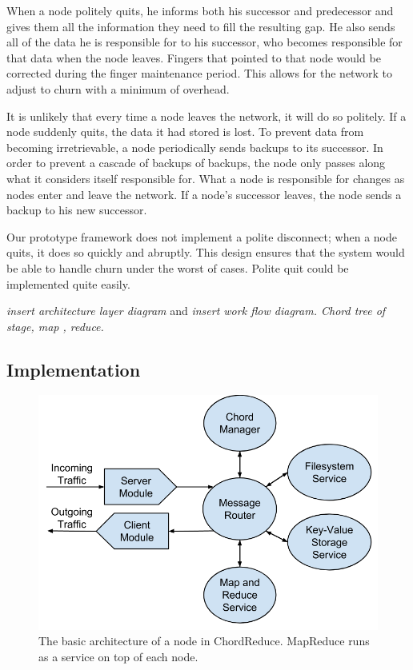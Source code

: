 \documentclass[10pt, conference, compsocconf]{IEEEtran}
\begin{document}
When a node politely quits, he informs both his successor and predecessor and gives them all the information they need to fill the resulting gap. He also sends all of the data he is responsible for to his successor, who becomes responsible for that data when the node leaves.  Fingers that pointed to that node would be corrected during the finger maintenance period.  This allows for the network to adjust to churn with a minimum of overhead.

It is unlikely that every time a node leaves the network, it will do so politely.  If a node suddenly quits, the data it had stored is lost. To prevent data from becoming irretrievable, a node periodically sends backups to its successor.  In order to prevent a cascade of backups of backups, the node only passes along what it considers itself responsible for.  What a node is responsible for changes as nodes enter and leave the network.  If a node's successor leaves, the node sends a backup to his new successor. 

Our prototype framework does not implement a polite disconnect;  when a node quits, it does so quickly and abruptly.  This design ensures that the  system would be able to handle churn under the worst of cases.  Polite quit could be implemented quite easily.


\textit{insert architecture layer diagram }  and \textit{insert work flow diagram.  Chord tree of stage, map , reduce.}

\subsection{Implementation}

\begin{figure}
    \includegraphics[width=\linewidth]{crArch}
    \caption{The basic architecture of a node in ChordReduce.  MapReduce runs as a service on top of each node.}
    \label{crArch}
\end{figure}
\end{document}
